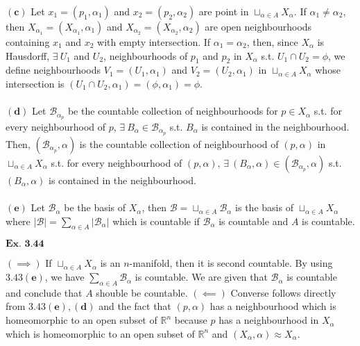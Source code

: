 \documentclass{article}
\begin{document}
$\mathbf{(c)}$ Let $x_1 = (p_1,\alpha_1)$ and $x_2 = (p_2,\alpha_2)$ are point in $\sqcup_{\alpha \in A}X_{\alpha}$. If $\alpha_1 \neq \alpha_2$, then $X_{\alpha_1} = (X_{\alpha_1}, \alpha_1)$ and $X_{\alpha_2} = (X_{\alpha_2}, \alpha_2)$ are open neighbourhoods containing $x_1$ and $x_2$ with empty intersection. If $\alpha_1 = \alpha_2$, then, since $X_\alpha$ is Hausdorff, $\exists\ U_1$ and $U_2$, neighbourhoods of $p_1$ and $p_2$ in $X_\alpha$ s.t. $U_1 \cap U_2 = \phi$, we define neighbourhoods $V_1 = (U_1,\alpha_1)$ and $V_2 = (U_2, \alpha_1)$ in $\sqcup_{\alpha \in A}X_{\alpha}$ whose intersection is $(U_1\cap U_2, \alpha_1) = (\phi,\alpha_1) = \phi$.\\~\\

$\mathbf{(d)}$ Let $\mathcal{B}_{\alpha_p}$ be the countable collection of neighbourhoods for $p \in X_{\alpha}$ s.t. for every neighbourhood of $p$, $\exists\ B_\alpha \in \mathcal{B}_{\alpha_p}$ s.t. $B_\alpha$ is contained in the neighbourhood. Then, $(\mathcal{B}_{\alpha_p},\alpha)$ is the countable collection of neighbourhood of $(p,\alpha)$ in $\sqcup_{\alpha \in A} X_\alpha$ s.t. for every neighbourhood of $(p,\alpha)$, $\exists\ (B_\alpha,\alpha) \in (\mathcal{B}_{\alpha_p},\alpha)$ s.t. $(B_\alpha,\alpha)$ is contained in the neighbourhood.\\~\\

$\mathbf{(e)}$ Let $\mathcal{B}_\alpha$ be the basis of $X_\alpha$, then $\mathcal{B} = \sqcup_{\alpha \in A}\mathcal{B}_\alpha$ is the basis of $\sqcup_{\alpha \in A}X_\alpha$ where $|\mathcal{B}| = \sum_{\alpha \in A}|\mathcal{B}_\alpha|$ which is countable if $\mathcal{B}_\alpha$ is countable and $A$ is countable.

\vspace{0.2in}

${\textbf{Ex. 3.44}}$

$(\implies)$ If $\sqcup_{\alpha \in A} X_{\alpha}$ is an $n$-manifold, then it is second countable. By using $\mathbf{3.43 (e)}$, we have $\sum_{\alpha \in A}\mathcal{B}_\alpha$ is countable. We are given that $\mathcal{B}_\alpha$ is countable and conclude that $A$ shouble be countable. $(\impliedby)$ Converse follows directly from $\mathbf{3.43 (e), (d)}$ and the fact that $(p,\alpha)$ has a neighbourhood which is homeomorphic to an open subset of $\mathbb{R}^n$ because $p$ has a neighbourhood in $X_\alpha$ which is homeomorphic to an open subset of $\mathbb{R}^n$ and $(X_\alpha,\alpha) \approx X_\alpha$. 
\end{document}
